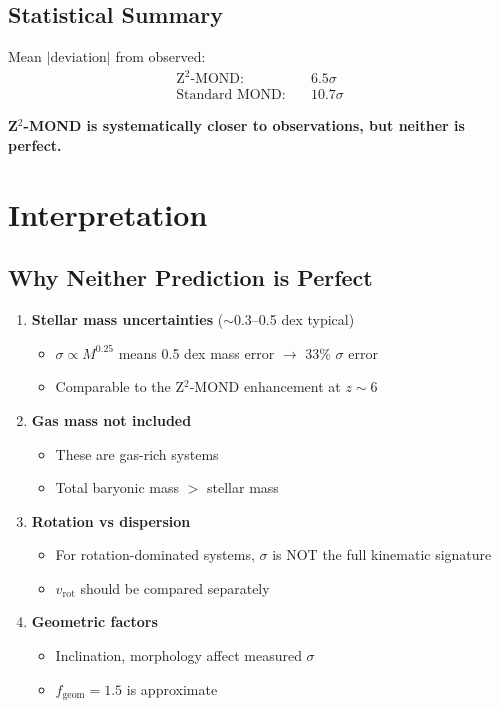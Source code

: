 \documentclass[12pt,a4paper]{article}
\begin{document}
\subsection{Statistical Summary}

Mean $|$deviation$|$ from observed:
\begin{align}
\text{Z}^2\text{-MOND:} \quad &6.5\sigma \\
\text{Standard MOND:} \quad &10.7\sigma
\end{align}

\textbf{Z$^2$-MOND is systematically closer to observations, but neither is perfect.}

\section{Interpretation}

\subsection{Why Neither Prediction is Perfect}

\begin{enumerate}
\item \textbf{Stellar mass uncertainties} ($\sim$0.3--0.5 dex typical)
\begin{itemize}
\item $\sigma \propto M^{0.25}$ means 0.5 dex mass error $\rightarrow$ 33\% $\sigma$ error
\item Comparable to the Z$^2$-MOND enhancement at $z \sim 6$
\end{itemize}

\item \textbf{Gas mass not included}
\begin{itemize}
\item These are gas-rich systems
\item Total baryonic mass $>$ stellar mass
\end{itemize}

\item \textbf{Rotation vs dispersion}
\begin{itemize}
\item For rotation-dominated systems, $\sigma$ is NOT the full kinematic signature
\item $v_{\text{rot}}$ should be compared separately
\end{itemize}

\item \textbf{Geometric factors}
\begin{itemize}
\item Inclination, morphology affect measured $\sigma$
\item $f_{\text{geom}} = 1.5$ is approximate
\end{itemize}
\end{enumerate}
\end{document}
